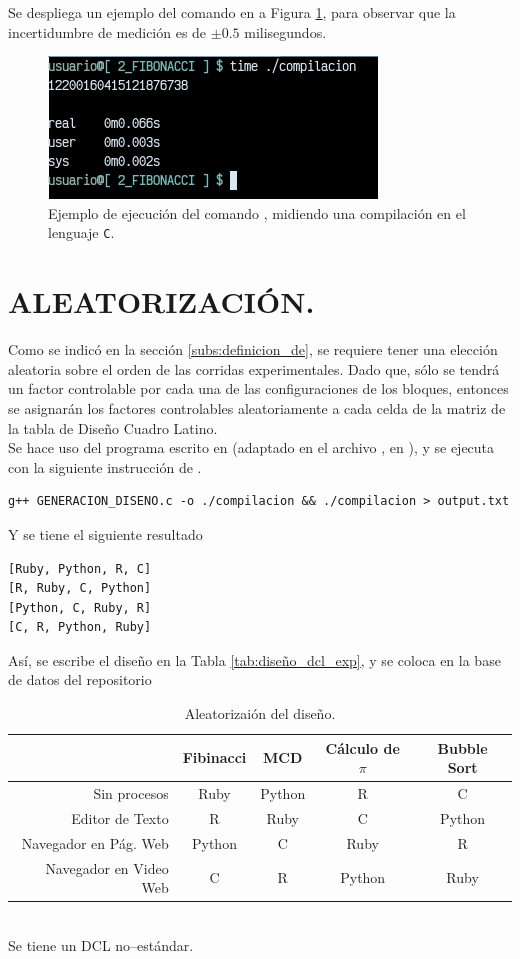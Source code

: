 \documentclass[11pt,a4paper]{article}
\begin{document}
\newpage
Se despliega un ejemplo del comando en a Figura \ref{fig:incert}, para observar que la incertidumbre de medición es de \(\pm 0.5\) milisegundos.
\begin{figure}[hbt!]
	\centering
	\includegraphics[width= 0.4 \linewidth]{IMAGENES/3/incertidumbre.png}
	\caption{Ejemplo de ejecución del comando , midiendo una compilación en el lenguaje \texttt{C}.}
	\label{fig:incert}
\end{figure}


\section{ALEATORIZACIÓN.} %
\label{sec:aleatorizacion}
Como se indicó en la sección \ref{subs:definicion_de}, se requiere tener una elección aleatoria sobre el orden de las corridas experimentales.
Dado que, sólo se tendrá un factor controlable por cada una de las configuraciones de los bloques, entonces se asignarán los factores controlables aleatoriamente a cada celda de la matriz de la tabla de Diseño Cuadro Latino. \\[2mm]

Se hace uso del programa escrito en  (adaptado en el archivo , en %
), y se ejecuta con la siguiente instrucción de .
\begin{lstlisting}
g++ GENERACION_DISENO.c -o ./compilacion && ./compilacion > output.txt
\end{lstlisting}
Y se tiene el siguiente resultado
\begin{lstlisting}[backgroundcolor=\color{gray!15}]
[Ruby, Python, R, C]
[R, Ruby, C, Python]
[Python, C, Ruby, R]
[C, R, Python, Ruby]
\end{lstlisting}
Así, se escribe el diseño en la Tabla \ref{tab:diseño_dcl_exp}, y se coloca en la base de datos del repositorio
\begin{table}[hbt!]
	\centering
	\footnotesize 
	\begin{tabular}{|r|*{4}{c|}}
		\hline 
		& Fibinacci &	MCD &	Cálculo de \(\pi\) & Bubble Sort \\ \hline
		Sin procesos & Ruby &  Python &  R &  C\\
		Editor de Texto & R &  Ruby &  C &  Python\\
		Navegador en Pág. Web & Python &  C &  Ruby &  R\\
		Navegador en Video Web & C &  R &  Python &  Ruby \\ \hline
	\end{tabular}
	\caption{Aleatorizaión del diseño.} 
	\label{tab:experimento_completo}
\end{table}\\
Se tiene un DCL no--estándar.
\end{document}

